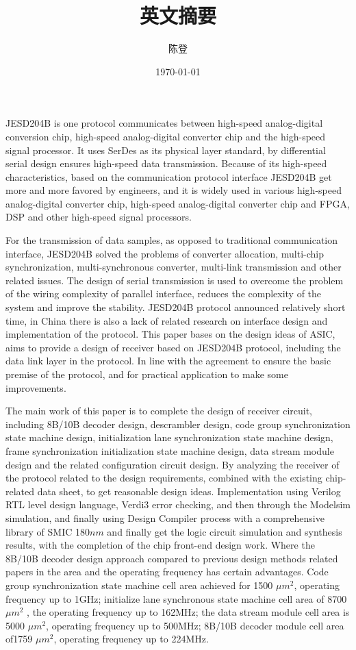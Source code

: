 \documentclass[UTF8]{ctexart}
\title{英文摘要}
\author{陈登}
\date{\today}
\begin{document}
JESD204B is one protocol communicates between high-speed analog-digital conversion chip, high-speed analog-digital converter chip and the high-speed signal processor. It uses SerDes as its physical layer standard, by differential serial design ensures high-speed data transmission. Because of its high-speed characteristics, based on the communication protocol interface JESD204B get more and more favored by engineers, and it is widely used in various high-speed analog-digital converter chip, high-speed analog-digital converter chip and FPGA, DSP and other high-speed signal processors.

For the transmission of data samples, as opposed to traditional communication interface, JESD204B solved the problems of converter allocation, multi-chip synchronization, multi-synchronous converter, multi-link transmission and other related issues. The design of serial transmission is used to overcome the problem of the wiring complexity of parallel interface, reduces the complexity of the system and improve the stability. JESD204B protocol announced relatively short time, in China there is also a lack of related research on interface design and implementation of the protocol. This paper bases on the design ideas of ASIC, aims to provide a design of receiver based on JESD204B protocol, including the data link layer in the protocol. In line with the agreement to ensure the basic premise of the protocol, and for practical application to make some improvements.

The main work of this paper is to complete the design of receiver circuit, including 8B/10B decoder design, descrambler design, code group synchronization state machine design, initialization lane synchronization state machine design, frame synchronization initialization state machine design, data stream module design and the related configuration circuit design. By analyzing the receiver of the protocol related to the design requirements, combined with the existing chip-related data sheet, to get reasonable design ideas. Implementation using Verilog RTL level design language, Verdi3 error checking, and then through the Modelsim simulation, and finally using Design Compiler process with a comprehensive library of SMIC 180$nm$ and finally get the logic circuit simulation and synthesis results, with the completion of the chip front-end design work. Where the 8B/10B decoder design approach compared to previous design methods related papers in the area and the operating frequency has certain advantages. Code group synchronization state machine cell area achieved for 1500 $\mu m^2$, operating frequency up to 1GHz; initialize lane synchronous state machine cell area of ​​8700 $\mu m^2$ , the operating frequency up to 162MHz; the data stream module cell area is 5000 $\mu m^2$, operating frequency up to 500MHz; 8B/10B decoder module cell area of ​​1759 $\mu m^2$, operating frequency up to 224MHz.


\end{document}

